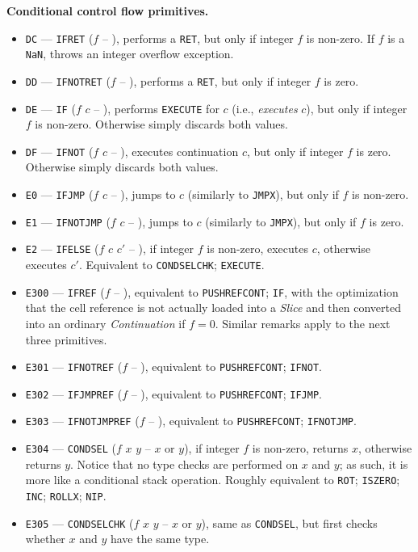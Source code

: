 \documentclass[12pt,oneside]{article}
\def\makepoint#1{\medbreak\noindent{\bf #1.\ }}
\def\nxsubpoint{\refstepcounter{subsubsection}%
  \smallbreak\makepoint{\thesubsubsection}}
\def\emb#1{\textbf{#1.}}
\begin{document}
\nxsubpoint\emb{Conditional control flow primitives}\label{sp:prim.cond.flow}
\begin{itemize}
\item {\tt DC} --- {\tt IFRET} ($f$ -- ), performs a {\tt RET}, but only if integer $f$ is non-zero. If $f$ is a {\tt NaN}, throws an integer overflow exception.
\item {\tt DD} --- {\tt IFNOTRET} ($f$ -- ), performs a {\tt RET}, but only if integer $f$ is zero.
\item {\tt DE} --- {\tt IF} ($f$ $c$ -- ), performs {\tt EXECUTE} for $c$ (i.e., {\em executes} $c$), but only if integer $f$ is non-zero. Otherwise simply discards both values.
\item {\tt DF} --- {\tt IFNOT} ($f$ $c$ -- ), executes continuation $c$, but only if integer $f$ is zero. Otherwise simply discards both values.
\item {\tt E0} --- {\tt IFJMP} ($f$ $c$ -- ), jumps to $c$ (similarly to {\tt JMPX}), but only if $f$ is non-zero.
\item {\tt E1} --- {\tt IFNOTJMP} ($f$ $c$ -- ), jumps to $c$ (similarly to {\tt JMPX}), but only if $f$ is zero.
\item {\tt E2} --- {\tt IFELSE} ($f$ $c$ $c'$ -- ), if integer $f$ is non-zero, executes $c$, otherwise executes $c'$. Equivalent to {\tt CONDSELCHK}; {\tt EXECUTE}.
\item {\tt E300} --- {\tt IFREF} ($f$ -- ), equivalent to {\tt PUSHREFCONT}; {\tt IF}, with the optimization that the cell reference is not actually loaded into a {\em Slice} and then converted into an ordinary {\em Continuation\/} if $f=0$. Similar remarks apply to the next three primitives.
\item {\tt E301} --- {\tt IFNOTREF} ($f$ -- ), equivalent to {\tt PUSHREFCONT}; {\tt IFNOT}.
\item {\tt E302} --- {\tt IFJMPREF} ($f$ -- ), equivalent to {\tt PUSHREFCONT}; {\tt IFJMP}.
\item {\tt E303} --- {\tt IFNOTJMPREF} ($f$ -- ), equivalent to {\tt PUSHREFCONT}; {\tt IFNOTJMP}.
\item {\tt E304} --- {\tt CONDSEL} ($f$ $x$ $y$ -- $x$ or $y$), if integer $f$ is non-zero, returns $x$, otherwise returns $y$. Notice that no type checks are performed on $x$ and $y$; as such, it is more like a conditional stack operation. Roughly equivalent to {\tt ROT}; {\tt ISZERO}; {\tt INC}; {\tt ROLLX}; {\tt NIP}.
\item {\tt E305} --- {\tt CONDSELCHK} ($f$ $x$ $y$ -- $x$ or $y$), same as {\tt CONDSEL}, but first checks whether $x$ and $y$ have the same type.

\end{itemize}
\end{document}
